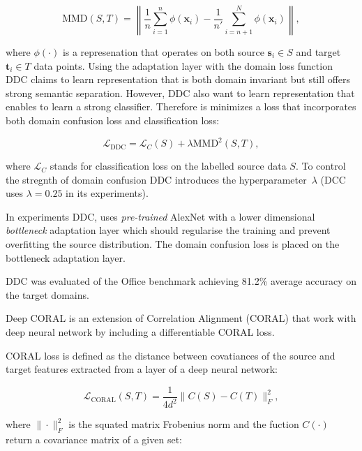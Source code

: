 \begin{equation}
	\mathrm{MMD}(S, T) = \left\|
	\frac{1}{n} \sum_{i = 1}^{n} \phi(\mathbf{x}_i) -
	\frac{1}{n'} \sum_{i = n + 1}^{N} \phi(\mathbf{x}_i)
	\right\|,
	\label{maximam_mean_discrepancy}
\end{equation}

where \(\phi(\cdot)\) is a represenation
that operates on both source \(\mathbf{s}_i \in S\) and target \(\mathbf{t}_i \in T\) data points.
Using the adaptation layer with the domain loss function DDC claims
to learn representation that is both domain invariant
but still offers strong semantic separation.
However, DDC also want to learn representation
that enables to learn a strong classifier.
Therefore is minimizes a loss that incorporates both domain confusion loss and classification loss:

\begin{equation}
	\mathcal{L}_{\mathrm{DDC}} = \mathcal{L}_C(S)
	+ \lambda \mathrm{MMD}^2(S, T),
\end{equation}

where \(\mathcal{L}_C\) stands for classification loss on the labelled source data \(S\).
To control the stregnth of domain confusion DDC introduces the hyperparameter~\(\lambda\)
(DCC uses \(\lambda = 0.25\) in its experiments).

In experiments DDC, uses \textit{pre-trained} AlexNet with a lower dimensional \textit{bottleneck} adaptation layer
which should regularise the training
and prevent overfitting the source distribution.
The domain confusion loss is placed on the bottleneck adaptation layer.

DDC was evaluated of the Office benchmark achieving 81.2\% average accuracy on the target domains.

Deep CORAL is an extension of Correlation Alignment (CORAL)
that work with deep neural network by including a differentiable CORAL loss.

CORAL loss is defined as the distance between covatiances of the source and target features extracted from a layer of a deep neural network:

\begin{equation}
	\mathcal{L}_{\mathrm{CORAL}}(S, T) = \frac{1}{4 d^2} \|C(S) - C(T)\|_F^2,
\end{equation}

where \(\|\cdot\|_F^2\) is the squated matrix Frobenius norm
and the fuction \(C(\cdot)\) return a covariance matrix of a given set:

